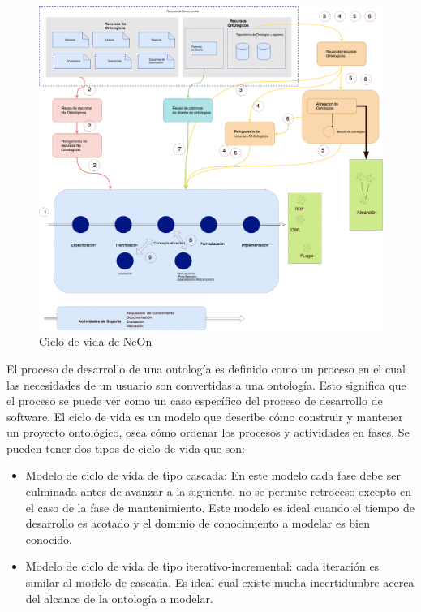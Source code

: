 \begin{figure}[h!]
    \centering
    \includegraphics[width=150mm]{figuras/Diagramas-NeonProcess}
    \caption{Ciclo de vida de NeOn}
    \label{img:neon ciclo de vida}
    \end{figure}

El proceso de desarrollo de una ontología es definido como un proceso en el cual las necesidades de un usuario son convertidas a una ontología. Esto significa que el proceso se puede ver como un caso específico del proceso de desarrollo de software.	
El ciclo de vida es un modelo que describe cómo construir y mantener un proyecto ontológico, osea cómo ordenar los procesos y actividades en fases. Se pueden tener dos tipos de ciclo de vida que son:

\begin{itemize}
    \item Modelo de ciclo de vida de tipo cascada: En este modelo cada fase debe ser culminada antes de avanzar a la siguiente, no se permite retroceso excepto en el caso de la fase de mantenimiento. Este modelo es ideal cuando el tiempo de desarrollo es acotado y el dominio de conocimiento a modelar es bien conocido.
    \item Modelo de ciclo de vida de tipo iterativo-incremental: cada iteración es similar al modelo de cascada. Es ideal cual existe mucha incertidumbre acerca del alcance de la ontología a modelar.
\end{itemize}

